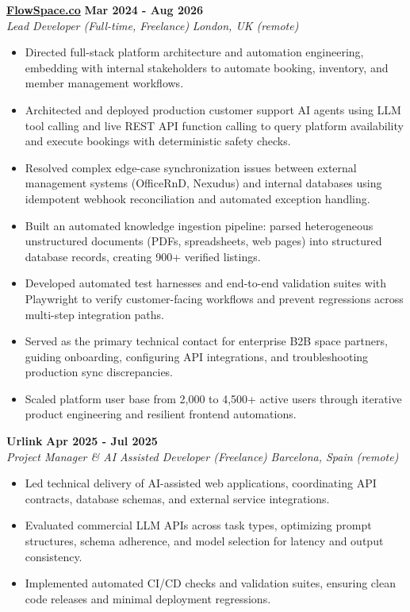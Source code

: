 \documentclass[10pt,a4paper]{article}
\newcommand{\role}[4]{%
  \textbf{#1} \hfill \textbf{#2}\\[1pt]%
  \textit{#3} \hfill \textit{#4}\\[2pt]%
}
\begin{document}
\role{\href{https://flowspace.co}{FlowSpace.co}}{Mar 2024 - Aug 2026}{Lead Developer (Full-time, Freelance)}{London, UK (remote)}
\begin{itemize}
  \item Directed full-stack platform architecture and automation engineering, embedding with internal stakeholders to automate booking, inventory, and member management workflows.
  \item Architected and deployed production customer support AI agents using LLM tool calling and live REST API function calling to query platform availability and execute bookings with deterministic safety checks.
  \item Resolved complex edge-case synchronization issues between external management systems (OfficeRnD, Nexudus) and internal databases using idempotent webhook reconciliation and automated exception handling.
  \item Built an automated knowledge ingestion pipeline: parsed heterogeneous unstructured documents (PDFs, spreadsheets, web pages) into structured database records, creating 900+ verified listings.
  \item Developed automated test harnesses and end-to-end validation suites with Playwright to verify customer-facing workflows and prevent regressions across multi-step integration paths.
  \item Served as the primary technical contact for enterprise B2B space partners, guiding onboarding, configuring API integrations, and troubleshooting production sync discrepancies.
  \item Scaled platform user base from 2,000 to 4,500+ active users through iterative product engineering and resilient frontend automations.
\end{itemize}

\role{Urlink}{Apr 2025 - Jul 2025}{Project Manager \& AI Assisted Developer (Freelance)}{Barcelona, Spain (remote)}
\begin{itemize}
  \item Led technical delivery of AI-assisted web applications, coordinating API contracts, database schemas, and external service integrations.
  \item Evaluated commercial LLM APIs across task types, optimizing prompt structures, schema adherence, and model selection for latency and output consistency.
  \item Implemented automated CI/CD checks and validation suites, ensuring clean code releases and minimal deployment regressions.
\end{itemize}
\end{document}
